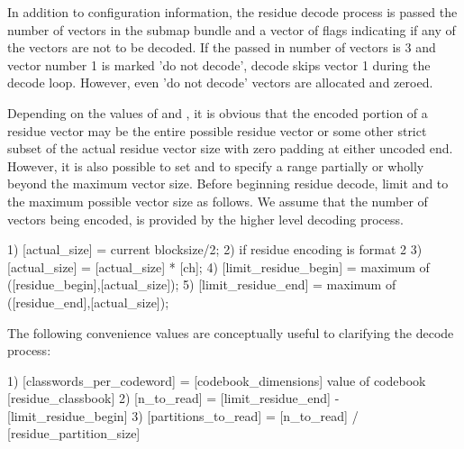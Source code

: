 In addition to configuration information, the residue decode process
is passed the number of vectors in the submap bundle and a vector of
flags indicating if any of the vectors are not to be decoded.  If the
passed in number of vectors is 3 and vector number 1 is marked 'do not
decode', decode skips vector 1 during the decode loop.  However, even
'do not decode' vectors are allocated and zeroed.

Depending on the values of  and
, it is obvious that the encoded
portion of a residue vector may be the entire possible residue vector
or some other strict subset of the actual residue vector size with
zero padding at either uncoded end.  However, it is also possible to
set  and
 to specify a range partially or
wholly beyond the maximum vector size.  Before beginning residue
decode, limit  and
 to the maximum possible vector size
as follows.  We assume that the number of vectors being encoded,
\varname{[ch]} is provided by the higher level decoding
process.

\begin{programlisting}
  1) [actual\_size] = current blocksize/2;
  2) if residue encoding is format 2
       3) [actual\_size] = [actual\_size] * [ch];
  4) [limit\_residue\_begin] = maximum of ([residue\_begin],[actual\_size]);
  5) [limit\_residue\_end] = maximum of ([residue\_end],[actual\_size]);
\end{programlisting}

The following convenience values are conceptually useful to clarifying
the decode process:

\begin{programlisting}
  1) [classwords\_per\_codeword] = [codebook\_dimensions] value of codebook [residue\_classbook]
  2) [n\_to\_read] = [limit\_residue\_end] - [limit\_residue\_begin]
  3) [partitions\_to\_read] = [n\_to\_read] / [residue\_partition\_size]
\end{programlisting}

